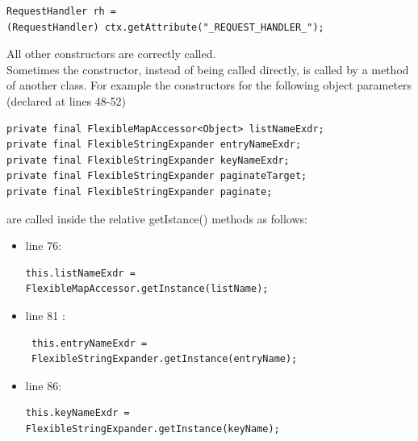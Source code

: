 \documentclass{article}
\begin{document}
\begin{flushleft}
\begin{itemize}
\begin{lstlisting}
RequestHandler rh = 
(RequestHandler) ctx.getAttribute("_REQUEST_HANDLER_");
\end{lstlisting}
\vspace{0.5cm}
\end{itemize}

 


All other constructors are correctly called.\\
Sometimes the constructor, instead of being called directly, is called by a method of another class. For example the constructors for the following object parameters (declared at lines 48-52) \\
\vspace{0.5cm}

\begin{lstlisting}
private final FlexibleMapAccessor<Object> listNameExdr; 
private final FlexibleStringExpander entryNameExdr; 
private final FlexibleStringExpander keyNameExdr;
private final FlexibleStringExpander paginateTarget; 
private final FlexibleStringExpander paginate;
\end{lstlisting}
\vspace{0.5cm}

are called inside the relative getIstance() methods as follows:\\
\vspace{0.5cm}
\begin{itemize}
\item line 76:  \\
\vspace{0.5cm}
\begin{lstlisting}
this.listNameExdr = 
FlexibleMapAccessor.getInstance(listName);
\end{lstlisting}
\vspace{0.5cm}


\item line 81 : \\
\vspace{0.5cm}
\begin{lstlisting}
 this.entryNameExdr = 
 FlexibleStringExpander.getInstance(entryName);
 \end{lstlisting}
 \vspace{0.5cm}


\item line 86:  \\
\vspace{0.5cm}
\begin{lstlisting}
this.keyNameExdr = 
FlexibleStringExpander.getInstance(keyName);
\end{lstlisting}
\vspace{0.5cm}


\end{itemize}
\end{flushleft}
\end{document}
